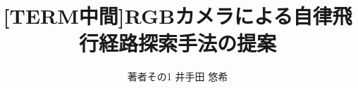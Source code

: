 \documentclass[uplatex,a4j,10pt]{jsarticle}
\begin{document}

\title{[TERM中間]RGBカメラによる自律飛行経路探索手法の提案}

\author{
    著者その1 {井手田 悠希}
}

 

\maketitle
\thispagestyle{empty}







\end{document}
